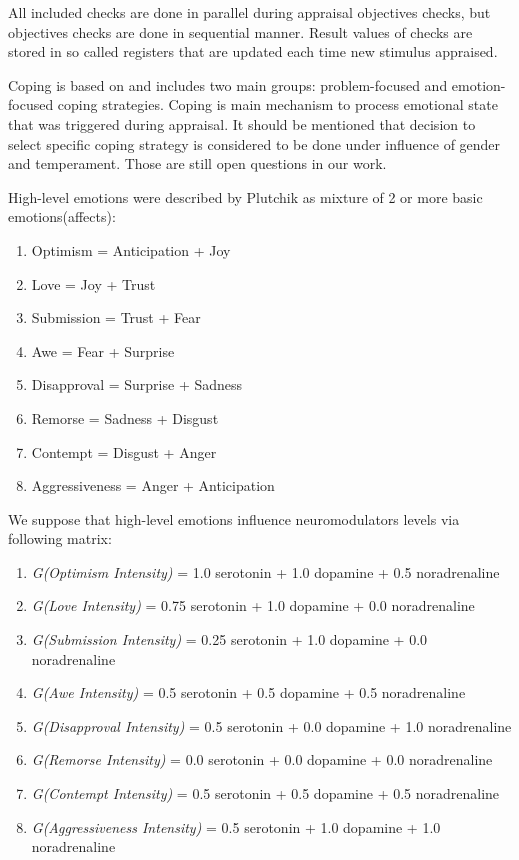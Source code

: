 All included checks are done in parallel during appraisal objectives checks, but objectives checks are done in sequential manner.
Result values of checks are stored in so called registers that are updated each time new stimulus appraised.

Coping is based on \cite{dont_worry_be_happy} and includes two main groups: problem-focused and emotion-focused coping strategies. Coping is main mechanism to process emotional state that was triggered during appraisal. It should be mentioned that decision to select specific coping strategy is considered to be done under influence of gender and temperament. Those are still open questions in our work.

High-level emotions were described by Plutchik \cite{natureofemotions} as mixture of 2 or more basic emotions(affects):

\begin{enumerate}
 \item  Optimism =	Anticipation + Joy
 \item  Love =	Joy + Trust
 \item  Submission = Trust + Fear
 \item  Awe = Fear + Surprise
 \item  Disapproval = Surprise + Sadness
 \item  Remorse = Sadness + Disgust
 \item  Contempt = Disgust + Anger
 \item  Aggressiveness =	Anger + Anticipation
\end{enumerate}

We suppose that high-level emotions influence neuromodulators levels via following matrix:

\begin{enumerate}
 \item  \emph{G(Optimism Intensity)} = 1.0 serotonin  + 1.0 dopamine + 0.5 noradrenaline
 \item  \emph{G(Love Intensity)} = 0.75 serotonin + 1.0 dopamine + 0.0 noradrenaline
 \item  \emph{G(Submission Intensity)} = 0.25 serotonin + 1.0 dopamine + 0.0 noradrenaline
 \item  \emph{G(Awe Intensity)} = 0.5 serotonin + 0.5 dopamine + 0.5 noradrenaline
 \item  \emph{G(Disapproval Intensity)} = 0.5 serotonin + 0.0 dopamine + 1.0 noradrenaline
 \item  \emph{G(Remorse Intensity)} = 0.0 serotonin + 0.0 dopamine + 0.0 noradrenaline
 \item  \emph{G(Contempt Intensity)} = 0.5 serotonin + 0.5 dopamine + 0.5 noradrenaline
 \item  \emph{G(Aggressiveness Intensity)} = 0.5 serotonin + 1.0 dopamine + 1.0 noradrenaline
\end{enumerate}

